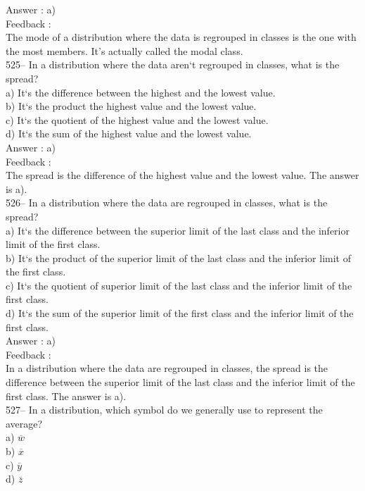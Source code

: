 \documentclass[letterpaper, 12pt]{article}
\begin{document}
Answer : a)\\

Feedback : \\
The mode of a distribution where the data is regrouped in classes is the one with the most members. It's actually called the modal class.\\

525-- In a distribution where the data aren`t regrouped in classes, what is the spread?\\
a) It`s the difference between the highest and the lowest value.\\
b) It`s the product the highest value and the lowest value.\\
c) It`s the quotient of the highest value and the lowest value.\\
d) It`s the sum of the highest value and the lowest value.\\

Answer : a)\\

Feedback : \\
The spread is the difference of the highest value and the lowest value.  The answer is a).\\

526-- In a distribution where the data are regrouped in classes, what is the spread?\\
a) It`s the difference between the superior limit of the last class and the inferior limit of the first class.\\
b) It`s the product of the superior limit of the last class and the inferior limit of the first class.\\
c) It`s the quotient of superior limit of the last class and the inferior limit of the first class.\\
d) It`s the sum of the superior limit of the first class and the inferior limit of the first class.\\

Answer : a) \\

Feedback : \\
In a distribution where the data are regrouped in classes, the spread is the difference between the superior limit of the last class and the inferior limit of the first class.
The answer is a).\\

527-- In a distribution, which symbol do we generally use to represent the average?\\
a) $\overline{w}$\\
b) $\overline{x}$\\
c) $\overline{y}$\\
d) $\overline{z}$\\
\end{document}
